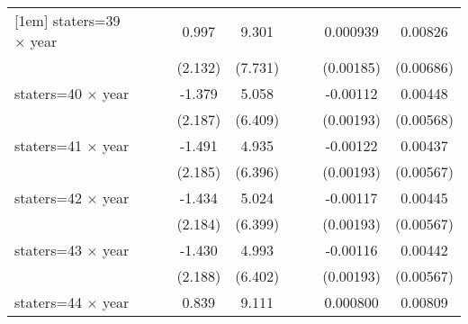 {\begin{longtable}{l*{8}{c}}
[1em]
staters=39 $\times$ year&                     &                     &       0.997         &       9.301         &                     &                     &    0.000939         &     0.00826         \\
                    &                     &                     &     (2.132)         &     (7.731)         &                     &                     &   (0.00185)         &   (0.00686)         \\
[1em]
staters=40 $\times$ year&                     &                     &      -1.379         &       5.058         &                     &                     &    -0.00112         &     0.00448         \\
                    &                     &                     &     (2.187)         &     (6.409)         &                     &                     &   (0.00193)         &   (0.00568)         \\
[1em]
staters=41 $\times$ year&                     &                     &      -1.491         &       4.935         &                     &                     &    -0.00122         &     0.00437         \\
                    &                     &                     &     (2.185)         &     (6.396)         &                     &                     &   (0.00193)         &   (0.00567)         \\
[1em]
staters=42 $\times$ year&                     &                     &      -1.434         &       5.024         &                     &                     &    -0.00117         &     0.00445         \\
                    &                     &                     &     (2.184)         &     (6.399)         &                     &                     &   (0.00193)         &   (0.00567)         \\
[1em]
staters=43 $\times$ year&                     &                     &      -1.430         &       4.993         &                     &                     &    -0.00116         &     0.00442         \\
                    &                     &                     &     (2.188)         &     (6.402)         &                     &                     &   (0.00193)         &   (0.00567)         \\
[1em]
staters=44 $\times$ year&                     &                     &       0.839         &       9.111         &                     &                     &    0.000800         &     0.00809         \\

\end{longtable}}

